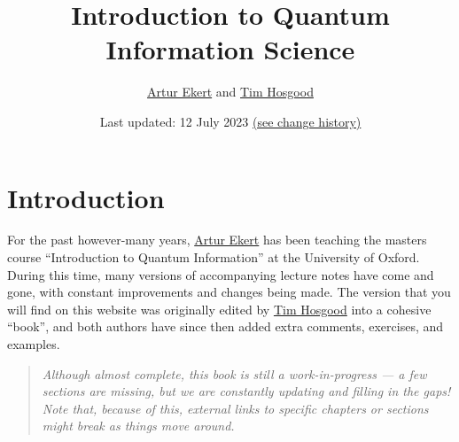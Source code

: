\documentclass[fleqn]{article}
\title{Introduction to Quantum Information Science}
\author{\href{https://www.arturekert.org/}{Artur Ekert} and \href{https://thosgood.com}{Tim Hosgood}}
\date{Last updated: 12 July 2023 \href{https://github.com/thosgood/qubit.guide/commits/main}{(see change history)}}
\renewcommand{\leq}{\leqslant}
\renewcommand{\geq}{\geqslant}
\let\oldsection\section
\renewcommand\section{\clearpage\oldsection}
\begin{document}
\setcounter{tocdepth}{2}
\maketitle

\hypertarget{introduction}{%
\section*{Introduction}\label{introduction}}

\providecommand{\xmapsto}[1]{\overset{#1}{\longmapsto}}
\providecommand{\bra}[1]{\langle#1|}
\providecommand{\ket}[1]{|#1\rangle}
\providecommand{\braket}[2]{\langle#1|#2\rangle}
\providecommand{\proj}[1]{|#1\rangle\langle#1|}
\providecommand{\av}[1]{\langle#1\rangle}
\providecommand{\tr}{\operatorname{tr}}
\providecommand{\id}{\mathbf{1}}
\providecommand{\diag}[2]{\begin{bmatrix}#1&0\\0&#2\end{bmatrix}}
\providecommand{\smalldiag}[2]{\left(\begin{smallmatrix}#1&0\\0&#2\end{smallmatrix}\right)}
\providecommand{\mqty}[1]{\begin{matrix}#1\end{matrix}}
\providecommand{\bmqty}[1]{\begin{bmatrix}#1\end{bmatrix}}
\renewcommand{\leq}{\leqslant}
\renewcommand{\geq}{\geqslant}

For the past however-many years, \href{https://www.arturekert.com/}{Artur Ekert} has been teaching the masters course ``Introduction to Quantum Information'' at the University of Oxford.
During this time, many versions of accompanying lecture notes have come and gone, with constant improvements and changes being made.
The version that you will find on this website was originally edited by \href{https://thosgood.com}{Tim Hosgood} into a cohesive ``book'', and both authors have since then added extra comments, exercises, and examples.

\begin{quote}
\emph{Although almost complete, this book is still a work-in-progress --- a few sections are missing, but we are constantly updating and filling in the gaps!}
\emph{Note that, because of this, external links to specific chapters or sections might break as things move around.}
\end{quote}
\end{document}
